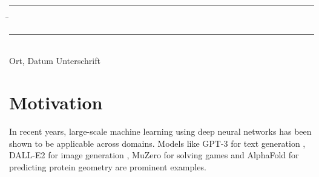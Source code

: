 \documentclass[12pt]{article}
\theoremstyle{definition}
\numberwithin{equation}{section}
\begin{document}
\vspace*{3em}

\begin{tabbing}
  \rule{.4\textwidth}{1pt} \hspace*{.2\textwidth}
  \= \rule{.4\textwidth}{1pt} \\
  Ort, Datum \> Unterschrift
\end{tabbing}

\newpage
\mbox{}
\newpage
\tableofcontents
\newpage
\listoffigures
\newpage
\section{Motivation}
\label{sec:Motivation}
In recent years, large-scale machine learning using deep neural networks has been shown to be applicable across domains. Models like GPT-3 for text generation \autocite{brownLanguageModelsAre2020}, DALL-E2 for image generation \autocite{rameshHierarchicalTextConditionalImage2022}, MuZero for solving games \autocite{schrittwieserMasteringAtariGo2020} and AlphaFold for predicting protein geometry \autocite{jumperHighlyAccurateProtein2021} are prominent examples.
\end{document}
